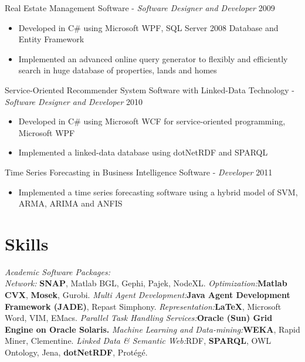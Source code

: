 \documentclass[letter]{res}
\begin{document}
\begin{resume}
Real Estate Management Software
- {\sl Software Designer and Developer} \hfill 2009\\
   \vspace{-4mm}
   \iflong
     \begin{itemize}
        \item Developed in C\# using Microsoft WPF, SQL Server 2008 Database and Entity Framework
        \item Implemented an advanced online query generator to flexibly and efficiently search in huge database of properties, lands and homes
     \end{itemize}
   \fi
   
Service-Oriented Recommender System Software with Linked-Data Technology
- {\sl Software Designer and Developer} \hfill 2010\\
   \vspace{-4mm}
   \iflong
     \begin{itemize}
        \item Developed in C\# using Microsoft WCF for service-oriented programming, Microsoft WPF
        \item Implemented a linked-data database using dotNetRDF and SPARQL
     \end{itemize}
   \fi

Time Series Forecasting in Business Intelligence Software
- {\sl Developer} \hfill 2011\\
   \vspace{-4mm}
   \iflong
     \begin{itemize}
        \item Implemented a time series forecasting software using a hybrid model of SVM, ARMA, ARIMA and ANFIS
     \end{itemize}
   \fi

\section{Skills}
\textit{Academic Software Packages:}\\
{\sl Network:} \textbf{SNAP}, Matlab BGL, Gephi, Pajek, NodeXL.
{\sl Optimization:}\textbf{Matlab CVX}, \textbf{Mosek}, Gurobi.
{\sl Multi Agent Development:}\textbf{Java Agent Development Framework (JADE)}, Repast Simphony.
{\sl Representation:}\textbf{\LaTeX}, Microsoft Word, VIM, EMacs.
{\sl Parallel Task Handling Services:}{\textbf{Oracle (Sun) Grid Engine on Oracle Solaris.}}
{\sl Machine Learning and Data-mining:}{\textbf{WEKA}, Rapid Miner, Clementine.}
{\sl Linked Data \& Semantic Web:}{RDF, \textbf{SPARQL}, OWL Ontology, Jena,
\textbf{dotNetRDF}, Prot\'{e}g\'{e}.}
\vspace{-2mm}


\end{resume}
\end{document}
